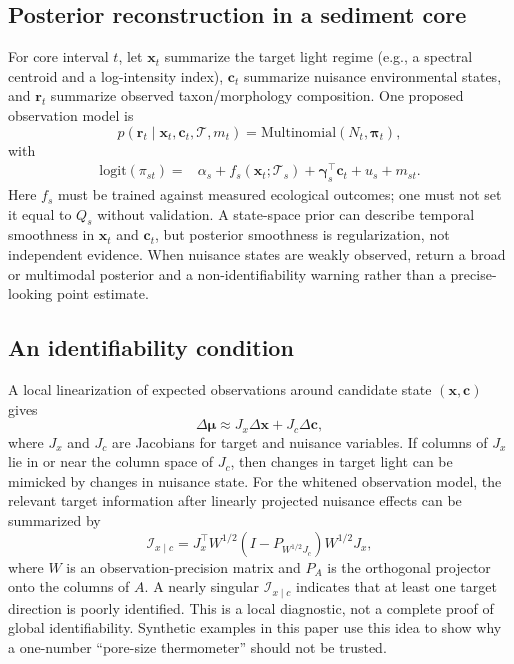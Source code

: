 \documentclass[11pt,a4paper]{article}
\newcommand{\Tfr}{\mathcal{T}}
\begin{document}
\subsection{Posterior reconstruction in a sediment core}
For core interval $t$, let $\bm{x}_t$ summarize the target light regime (e.g., a spectral centroid and a log-intensity index), $\bm{c}_t$ summarize nuisance environmental states, and $\bm{r}_t$ summarize observed taxon/morphology composition. One proposed observation model is
\begin{equation}
p(\bm{r}_t\mid\bm{x}_t,\bm{c}_t,\mathcal{T},m_t)=\mathrm{Multinomial}\!\left(N_t,\bm{\pi}_t\right),
\label{eq:core}
\end{equation}
with
\begin{align}
\mathrm{logit}(\pi_{st})={}&\alpha_s+f_s(\bm{x}_t;\Tfr_s)+\bm{\gamma}_s^\top\bm{c}_t+u_s+m_{st}.
\label{eq:composition}
\end{align}
Here $f_s$ must be trained against measured ecological outcomes; one must not set it equal to $Q_s$ without validation. A state-space prior can describe temporal smoothness in $\bm{x}_t$ and $\bm{c}_t$, but posterior smoothness is regularization, not independent evidence. When nuisance states are weakly observed, return a broad or multimodal posterior and a non-identifiability warning rather than a precise-looking point estimate.

\subsection{An identifiability condition}
A local linearization of expected observations around candidate state $(\bm{x},\bm{c})$ gives
\begin{equation}
\Delta\bm{\mu}\approx J_x\Delta\bm{x}+J_c\Delta\bm{c},
\label{eq:jac}
\end{equation}
where $J_x$ and $J_c$ are Jacobians for target and nuisance variables. If columns of $J_x$ lie in or near the column space of $J_c$, then changes in target light can be mimicked by changes in nuisance state. For the whitened observation model, the relevant target information after linearly projected nuisance effects can be summarized by
\begin{equation}
\mathcal{I}_{x\mid c}=J_x^\top W^{1/2}(I-P_{W^{1/2}J_c})W^{1/2}J_x,
\label{eq:info}
\end{equation}
where $W$ is an observation-precision matrix and $P_A$ is the orthogonal projector onto the columns of $A$. A nearly singular $\mathcal{I}_{x\mid c}$ indicates that at least one target direction is poorly identified. This is a local diagnostic, not a complete proof of global identifiability. Synthetic examples in this paper use this idea to show why a one-number ``pore-size thermometer'' should not be trusted.
\end{document}
